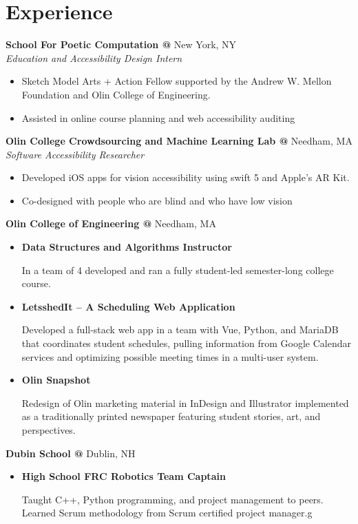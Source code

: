 \documentclass[10pt]{article} %
\begin{document}
\begin{minipage}[t]{0.8\textwidth}
\section*{Experience}
\textbf{School For Poetic Computation @} \space New York, NY\\
\textit{Education and Accessibility Design Intern}\\
\begin{itemize} [noitemsep,topsep=0pt]
  \item Sketch Model Arts + Action Fellow supported by the Andrew W. Mellon Foundation and Olin College of Engineering.
  \item Assisted in online course planning and web accessibility auditing
    \\
\end{itemize}
\textbf{Olin College Crowdsourcing and Machine Learning Lab @} \space Needham, MA\\
\textit{Software Accessibility Researcher}\\
\begin{itemize} [noitemsep,topsep=0pt]
  \item Developed iOS apps for vision accessibility using swift 5 and Apple’s AR Kit.
  \item Co-designed with people who are blind and who have low vision
  \\
\end{itemize}
\textbf{Olin College of Engineering @} \space Needham, MA\\
\begin{itemize} [noitemsep,topsep=0pt]
\item {}\textbf{Data Structures and Algorithms Instructor}
  
  In a team of 4 developed and ran a fully student-led semester-long college course.
\item {}\textbf{LetsshedIt – A Scheduling Web Application}

  Developed a full-stack web app in a team with Vue, Python, and MariaDB that coordinates student schedules, pulling information from Google Calendar services and optimizing possible meeting times in a multi-user system.
\item {}\textbf{Olin Snapshot }

   Redesign of Olin marketing material in InDesign and Illustrator implemented as a traditionally printed newspaper featuring student stories, art, and perspectives.
  \\
\end{itemize}
\textbf{Dubin School @} \space Dublin, NH\\
\begin{itemize} [noitemsep,topsep=0pt]
\item {}\textbf{High School FRC Robotics Team Captain}

  Taught C++, Python programming, and project management to peers. Learned Scrum methodology from Scrum certified project manager.g
  \\
\end{itemize}
\end{minipage}
\end{document}
